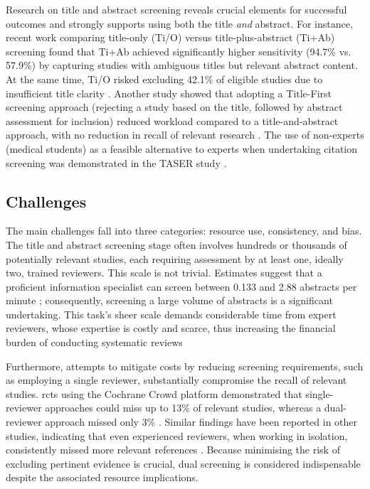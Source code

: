 \documentclass[10pt,oneside]{book}
\begin{document}
Research on title and abstract screening reveals crucial elements for successful outcomes and strongly supports using both the title \emph{and} abstract. For instance, recent work comparing title-only (Ti/O) versus title-plus-abstract (Ti+Ab) screening found that Ti+Ab achieved significantly higher sensitivity (94.7\% vs. 57.9\%) by capturing studies with ambiguous titles but relevant abstract content. At the same time, Ti/O risked excluding 42.1\% of eligible studies due to insufficient title clarity \cite{teo_title-plus-abstract_2023}. Another study showed that adopting a Title-First screening approach (rejecting a study based on the title, followed by abstract assessment for inclusion) reduced workload compared to a title-and-abstract approach, with no reduction in recall of relevant research \cite{mateen_titles_2013}. The use of non-experts (medical students) as a feasible alternative to experts when undertaking citation screening was demonstrated in the TASER study \cite{ng_title_2014}.


\subsection{Challenges}

The main challenges fall into three categories: resource use, consistency, and bias. The title and abstract screening stage often involves hundreds or thousands of potentially relevant studies, each requiring assessment by at least one, ideally two, trained reviewers. This scale is not trivial. Estimates suggest that a proficient information specialist can screen between 0.133 and 2.88 abstracts per minute \cite{shemilt_use_2016,giummarra_evaluation_2020,felizardo_visual_2013}; consequently, screening a large volume of abstracts is a significant undertaking. This task's sheer scale demands considerable time from expert reviewers, whose expertise is costly and scarce, thus increasing the financial burden of conducting systematic reviews

Furthermore, attempts to mitigate costs by reducing screening requirements, such as employing a single reviewer, substantially compromise the recall of relevant studies. \gls*{rcts} using the Cochrane Crowd platform demonstrated that single-reviewer approaches could miss up to 13\% of relevant studies, whereas a dual-reviewer approach missed only 3\% \cite{gartlehner_single-reviewer_2020}. Similar findings have been reported in other studies, indicating that even experienced reviewers, when working in isolation, consistently missed more relevant references \cite{waffenschmidt_single_2019}. Because minimising the risk of excluding pertinent evidence is crucial, dual screening is considered indispensable despite the associated resource implications.
\end{document}
